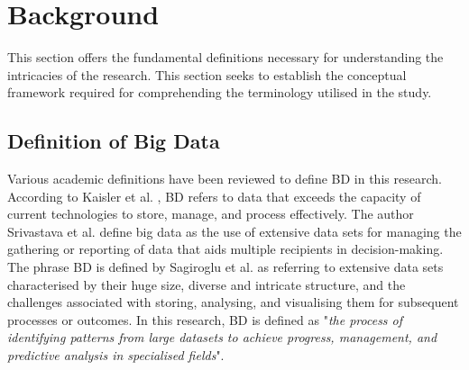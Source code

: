 \documentclass[preprint,12pt]{elsarticle}
\begin{document}
\section{Background} \label{sec:background} 

This section offers the fundamental definitions necessary for understanding the intricacies of the research. This section seeks to establish the conceptual framework required for comprehending the terminology utilised in the study. 

\subsection{Definition of Big Data} Various academic definitions have been reviewed to define BD in this research. According to Kaisler et al. \cite{Kaisler2013}, BD refers to data that exceeds the capacity of current technologies to store, manage, and process effectively. The author Srivastava et al. \cite{Srivastava2016} define big data as the use of extensive data sets for managing the gathering or reporting of data that aids multiple recipients in decision-making. The phrase BD is defined by Sagiroglu et al. \cite{Sagiroglu2013} as referring to extensive data sets characterised by their huge size, diverse and intricate structure, and the challenges associated with storing, analysing, and visualising them for subsequent processes or outcomes. In this research, BD is defined as "\emph{the process of identifying patterns from large datasets to achieve progress, management, and predictive analysis in specialised fields}". 




\end{document}
